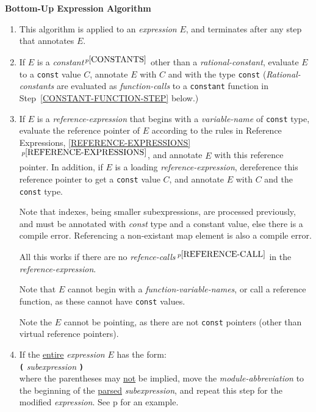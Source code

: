 \documentclass[12pt]{article}
\newcommand{\TT}[1]{{\tt \bfseries #1}}
\newcommand{\itemref}[1]{\ref{#1}$\,^{p\pageref{#1}}$}
\newcommand{\pagref}[1]{p\pageref{#1}}
\newcommand{\pagnote}[1]{$\,^{p\pageref{#1}}$}
\begin{document}
\centerline{\bf Bottom-Up Expression Algorithm}
\begin{enumerate}

\item This algorithm is applied to an {\em expression} $E$, and
terminates after any step that annotates $E$.

\item\label{CONSTANT-STEP}
If $E$ is a {\em constant}\pagnote{CONSTANTS} other than
a {\em rational-constant}, evaluate $E$
to a {\tt const} value $C$, annotate $E$
with $C$ and with the type {\tt const}
({\em Rational-constants} are evaluated as {\em function-calls} to
a {\tt constant} function in Step~\ref{CONSTANT-FUNCTION-STEP} below.)

\item\label{CONSTANT-REFERENCE-EXPRESSION-STEP}
If $E$ is a {\em reference-expression} that
begins with a {\em variable-name} of {\tt const} type, evaluate
the reference pointer of $E$ according to the rules in
Reference Expressions, \itemref{REFERENCE-EXPRESSIONS}, and annotate
$E$ with this reference pointer.
In addition, if $E$ is a loading {\em reference-expression}, dereference this
reference pointer to get a {\tt const} value $C$, and annotate
$E$ with $C$ and the {\tt const} type.

Note that indexes, being smaller subexpressions, are processed previously,
and must be annotated with {\em const} type and a constant value, else
there is a compile error.  Referencing a non-existant map element is also
a compile error.

All this works if there are no {\em refence-calls}\pagnote{REFERENCE-CALL}
in the {\em reference-expression}.

Note that $E$ cannot begin with a {\em function-variable-names},
or call a reference function, as these cannot have {\tt const} values.

Note the $E$ cannot be pointing, as there are not {\tt const} pointers
(other than virtual reference pointers).

\item\label{MODULE-PROPAGATION-STEP}
If the \underline{entire} {\em expression} $E$ has the form: \\
\hspace*{2in}{\em module-abbreviation} \TT{(} {\em subexpression} \TT{)} \\
where the parentheses may \underline{not}
be implied, move the {\em module-abbreviation}
to the beginning of the \underline{parsed} {\em subexpression}, and
repeat this step for the modified {\em expression}.
See \pagref{MA-SYNTACTIC-SUGAR} for an example.


\end{enumerate}
\end{document}
